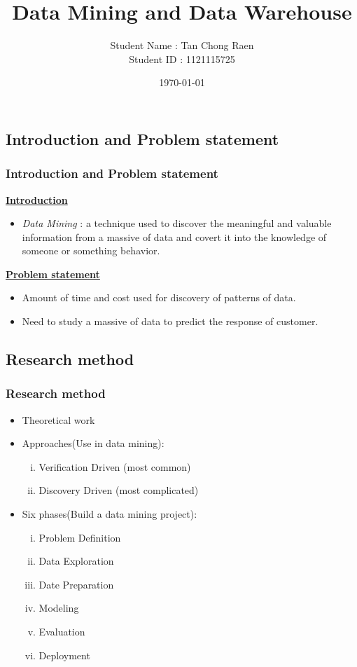 \documentclass{beamer}
\author{\hspace{0.285cm}Student Name : Tan Chong Raen\\Student ID : 1121115725}
\title{Data Mining and Data Warehouse}
\institute{Multimedia University\\(Cyberjaya Campus)}
\date{\today}
\begin{document}
\maketitle

\begin{frame}
\section{Introduction and Problem statement}
\frametitle{Introduction and Problem statement}
\large \textbf{\underline{Introduction}}
\begin{itemize}
\item \textit{Data Mining} : a technique used to discover the meaningful and valuable information from a massive of data and covert it into the knowledge of someone or something behavior.
\end{itemize}
\large \textbf{\underline{Problem statement}}
\begin{itemize}
\item Amount of time and cost used for discovery of patterns of data.
\item Need to study a massive of data to predict the response of customer.
\end{itemize}
\end{frame}

\begin{frame}
\section{Research method}
\frametitle{Research method}
\begin{itemize}
\item Theoretical work
\item Approaches(Use in data mining):
\begin{enumerate}[i.]
\item Verification Driven (most common)
\item Discovery Driven (most complicated)
\end{enumerate}
\item Six phases(Build a data mining project):
\begin{enumerate}[i.]
\item Problem Definition
\item Data Exploration
\item Date Preparation
\item Modeling
\item Evaluation
\item Deployment
\end{enumerate}
\end{itemize}
\end{frame}
\end{document}
